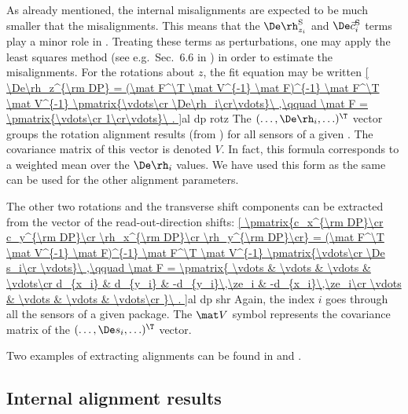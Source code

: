 
As already mentioned, the internal misalignments are expected to be much smaller that the  misalignments. This means that the $\De\rh_{z_i}^{\rm S}$ and $ \De\vec c_i^{\rm S}$ terms play a minor role in . Treating these terms as perturbations, one may apply the least squares method (see e.g.~Sec.~6.6 in ) in order to estimate the  misalignments. For the rotations about $z$, the fit equation may be written
\eqref{
	\De\rh_z^{\rm DP} = (\mat F^\T \mat V^{-1} \mat F)^{-1} \mat F^\T \mat V^{-1} \pmatrix{\vdots\cr \De\rh_i\cr\vdots}\ ,\qquad
	\mat F = \pmatrix{\vdots\cr 1\cr\vdots}\ .
}{al dp rotz}
The $(\ldots, \De\rh_i, \ldots)^\T$ vector groups the rotation alignment results (from ) for all sensors of a given . The covariance matrix of this vector is denoted $V$. In fact, this formula corresponds to a weighted mean over the $\De\rh_i$ values. We have used this form as the same can be used for the other  alignment parameters.

The other two  rotations and the transverse  shift components can be extracted from the vector of the read-out-direction shifts:
\eqref{
	\pmatrix{c_x^{\rm DP}\cr c_y^{\rm DP}\cr \rh_x^{\rm DP}\cr \rh_y^{\rm DP}\cr} =
	(\mat F^\T \mat V^{-1} \mat F)^{-1} \mat F^\T \mat V^{-1}
	\pmatrix{\vdots\cr \De s_i\cr \vdots}\ ,\qquad
	\mat F = \pmatrix{
		\vdots & \vdots & \vdots & \vdots\cr
		d_{x_i} & d_{y_i} & -d_{y_i}\,\ze_i & -d_{x_i}\,\ze_i\cr
		\vdots & \vdots & \vdots & \vdots\cr
	}\ .
}{al dp shr}
Again, the index $i$ goes through all the sensors of a given package. The $\mat V$ symbol represents the covariance matrix of the $(\ldots, \De s _i, \ldots)^\T$ vector.

Two examples of extracting  alignments can be found in  and .


\subsection[al int res]{Internal alignment results}

